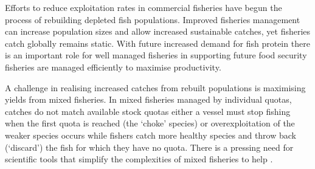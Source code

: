 \documentclass[12pt]{article}
\begin{document}
\begin{linenumbers}


 Efforts to reduce exploitation rates in commercial fisheries
have begun the process of rebuilding depleted fish populations\cite{Worm2009}.
Improved fisheries management can increase
population sizes and allow increased sustainable catches, yet fisheries catch
globally remains static\cite{FAO2016}. With future increased demand for fish
protein there is an important role for well managed
fisheries in supporting future food
security\cite{Mcclanahan2015}
 fisheries are
managed efficiently to maximise productivity.

A challenge in realising increased catches
from rebuilt populations is maximising yields from mixed
fisheries\cite{Branch2008, Kuriyama2016, Ulrich2016}. In mixed
fisheries managed by
individual quotas, 
 catches do not match available stock quotas
either a vessel must stop fishing when the first quota is reached (the `choke'
species) or overexploitation of the weaker species occurs while
fishers catch more healthy species and throw back
(`discard') the fish for which they have no quota\cite{Batsleer2015}.  There
is a pressing need for scientific tools that simplify the
complexities of mixed fisheries to help . 


\end{linenumbers}
\end{document}
